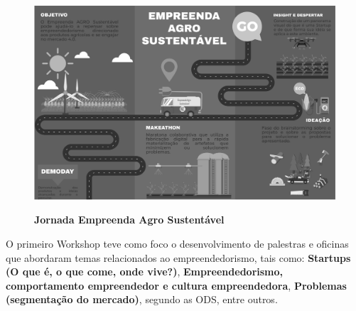 \begin{figure}[!htb]
\centering
\caption{\textbf{Jornada Empreenda Agro Sustentável}}
\includegraphics[scale=0.4]{Imagens/jornada.png}
\label{figura_17}
\end{figure}


O primeiro Workshop teve como foco o desenvolvimento de palestras e oficinas que abordaram temas relacionados ao empreendedorismo, tais como: \textbf{Startups (O que é, o que come, onde vive?)}, \textbf{Empreendedorismo, comportamento empreendedor e cultura empreendedora},  \textbf{Problemas (segmentação do mercado)}, segundo as ODS, entre outros.  



